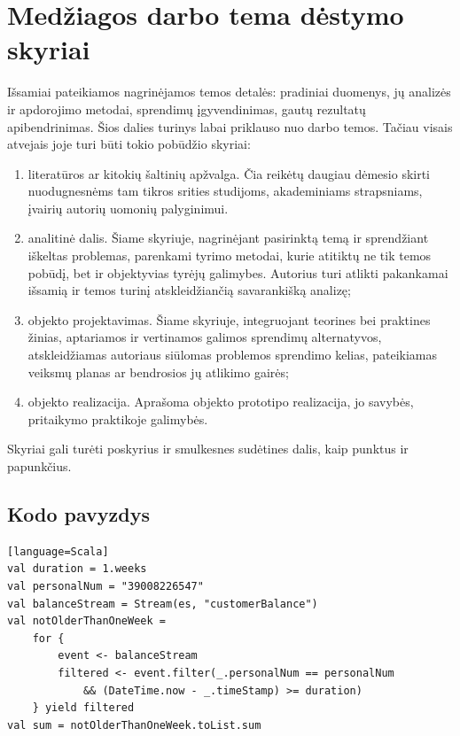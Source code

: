 \documentclass{VUMIFPSmagistrinis}
\begin{document}
\section{Medžiagos darbo tema dėstymo skyriai}
Išsamiai pateikiamos nagrinėjamos temos detalės: pradiniai duomenys, jų
analizės ir apdorojimo metodai, sprendimų įgyvendinimas, gautų rezultatų
apibendrinimas. Šios dalies turinys labai priklauso nuo darbo temos. Tačiau
visais atvejais joje turi būti tokio pobūdžio skyriai:
\begin{enumerate}
    \item literatūros ar kitokių šaltinių apžvalga. Čia reikėtų daugiau dėmesio
        skirti nuodugnesnėms tam tikros srities studijoms, akademiniams
        strapsniams, įvairių autorių uomonių palyginimui.
    \item analitinė dalis. Šiame skyriuje, nagrinėjant pasirinktą temą ir
        sprendžiant iškeltas problemas, parenkami tyrimo metodai, kurie
        atitiktų ne tik temos pobūdį, bet ir objektyvias tyrėjų galimybes.
        Autorius turi atlikti pakankamai išsamią ir temos turinį
        atskleidžiančią savarankišką analizę;
    \item objekto projektavimas. Šiame skyriuje, integruojant teorines bei
        praktines žinias, aptariamos ir vertinamos galimos sprendimų
        alternatyvos, atskleidžiamas autoriaus siūlomas problemos sprendimo
        kelias, pateikiamas veiksmų planas ar bendrosios jų atlikimo gairės;
    \item objekto realizacija. Aprašoma objekto prototipo realizacija, jo
        savybės, pritaikymo praktikoje galimybės.
\end{enumerate}
Skyriai gali turėti poskyrius ir smulkesnes sudėtines dalis, kaip punktus ir
papunkčius.

\subsection{Kodo pavyzdys}

\begin{lstlisting}[caption=Vartotojo einamosios sąskaitos balansas naudojant įsivaizduojamą Scala API, label=balance][language=Scala]
val duration = 1.weeks
val personalNum = "39008226547"
val balanceStream = Stream(es, "customerBalance")
val notOlderThanOneWeek =
    for {
        event <- balanceStream
        filtered <- event.filter(_.personalNum == personalNum
            && (DateTime.now - _.timeStamp) >= duration)
    } yield filtered
val sum = notOlderThanOneWeek.toList.sum
\end{lstlisting}
\end{document}

